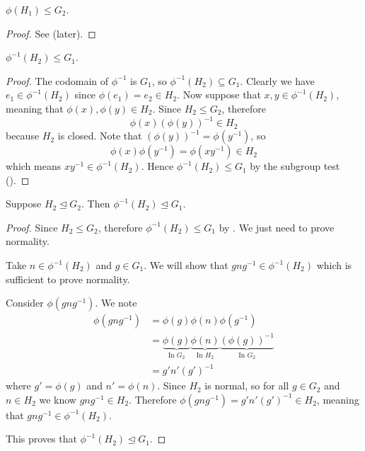\begin{proposition}\label{prop-homomorphism-image-is-subgroup}
    $\phi(H_1) \leq G_2$.
\end{proposition}
\begin{proof}
    See  (later).
\end{proof}

\begin{proposition}\label{prop-homomorphism-inverse-is-subgroup}
    $\phi^{-1}(H_2) \leq G_1$.
\end{proposition}
\begin{proof}
    The codomain of $\phi^{-1}$ is $G_1$, so $\phi^{-1}(H_2) \subseteq G_1$. Clearly we have $e_1 \in \phi^{-1}(H_2)$ since $\phi(e_1) = e_2 \in H_2$. Now suppose that $x, y \in \phi^{-1}(H_2)$, meaning that $\phi(x), \phi(y) \in H_2$. Since $H_2 \leq G_2$, therefore
    \[
        \phi(x)\left(\phi(y)\right)^{-1} \in H_2
    \]
    because $H_2$ is closed. Note that $\left(\phi(y)\right)^{-1} = \phi(y^{-1})$, so
    \[
        \phi(x)\phi(y^{-1}) = \phi(xy^{-1}) \in H_2
    \]
    which means $xy^{-1} \in \phi^{-1}(H_2)$. Hence $\phi^{-1}(H_2) \leq G_1$ by the subgroup test ().
\end{proof}

\begin{proposition}
    Suppose $H_2 \unlhd G_2$. Then $\phi^{-1}(H_2) \unlhd G_1$.
\end{proposition}
\begin{proof}
    Since $H_2 \leq G_2$, therefore $\phi^{-1}(H_2) \leq G_1$ by . We just need to prove normality.

    Take $n \in \phi^{-1}(H_2)$ and $g \in G_1$. We will show that $gng^{-1} \in \phi^{-1}(H_2)$ which is sufficient to prove normality.

    Consider $\phi(gng^{-1})$. We note
    \begin{align*}
        \phi(gng^{-1}) &= \phi(g)\phi(n)\phi(g^{-1}) \\
        &= \underbrace{\phi(g)}_{\text{In }G_2} \underbrace{\phi(n)}_{\text{In }H_2} \underbrace{\left(\phi(g)\right)^{-1}}_{\text{In }G_2}\\
        &= g'n'(g')^{-1}
    \end{align*}
    where $g' = \phi(g)$ and $n' = \phi(n)$. Since $H_2$ is normal, so for all $g \in G_2$ and $n \in H_2$ we know $gng^{-1} \in H_2$. Therefore $\phi(gng^{-1}) = g'n'(g')^{-1} \in H_2$, meaning that $gng^{-1} \in \phi^{-1}(H_2)$.

    This proves that $\phi^{-1}(H_2) \unlhd G_1$.
\end{proof}


